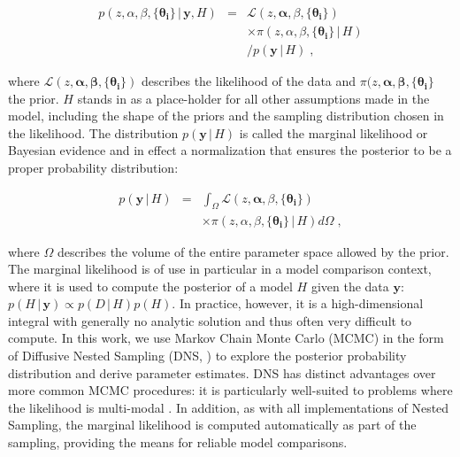 \documentclass[12pt]{emulateapj}
\newcommand{\given}{\,|\,}
\newcommand{\counts}{y}
\newcommand{\pars}{\theta}
\newcommand{\likelihood}{{\mathcal L}}
\begin{document}
\begin{eqnarray}
p(z, \alpha, \beta, \{\bm{\pars_{i}}\} \given  \bm{\counts}, H) & = & \likelihood(z, \bm{\alpha}, \beta, \{\bm{\pars_{i}}\}) \\\nonumber
					& & \times \pi(z, \alpha, \beta, \{\bm{\pars_{i}}\} \given H) \\\nonumber
					& &  / p(\bm{\counts} \given H)\; ,
\end{eqnarray} 

\noindent where $\likelihood(z, \bm{\alpha}, \bm{\beta}, \{\bm{\pars_{i}}\})$ describes the likelihood of the data and $\pi(z, \bm{\alpha}, \bm{\beta}, \{\bm{\pars_{i}}\} $ the prior. $H$ stands in as a place-holder for all other assumptions made in the model, including the shape of the priors and the sampling distribution chosen in the likelihood. The distribution $p(\bm{\counts} \given H)$ is called the marginal likelihood or Bayesian evidence and in effect a normalization that ensures the posterior to be a proper probability distribution:

\begin{eqnarray}
p(\bm{\counts} \given H) & = & \int_\Omega{ \likelihood(z, \bm{\alpha}, \beta, \{\bm{\pars_{i}}\}) } \\\nonumber
					& &{ \times \pi(z, \alpha, \beta, \{\bm{\pars_{i}}\} \given H) d\Omega} \; ,
\end{eqnarray}

\noindent where $\Omega$ describes the volume of the entire parameter space allowed by the prior. The marginal likelihood is of use in particular in a model comparison context, where it is used to compute the posterior of a model $H$ given the data $\bm{\counts}$: $p(H \given \bm{\counts}) \propto p(D \given H) p(H)$. In practice, however, it is a high-dimensional integral with generally no analytic solution and thus often very difficult to compute. In this work, we use Markov Chain Monte Carlo (MCMC) in the form of Diffusive Nested Sampling (DNS, \citealt{brewer2013}) to explore the posterior probability distribution and derive parameter estimates. DNS has distinct advantages over more common MCMC procedures: it is particularly well-suited to problems where the likelihood is multi-modal \citep{brewer2011}. In addition, as with all implementations of Nested Sampling, the marginal likelihood is computed automatically as part of the sampling, providing the means for reliable model comparisons. 
\end{document}
